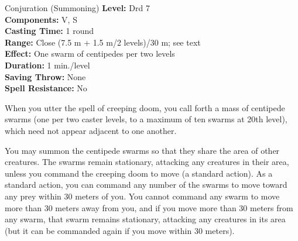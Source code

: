 {Conjuration (Summoning)}
{
	\textbf{Level:}
	Drd 7\\
	\textbf{Components:}
	V, S\\
	\textbf{Casting Time:}
	1 round\\
	\textbf{Range:}
	Close (7.5 m + 1.5 m/2 levels)/30 m; see text\\
	\textbf{Effect:}
	One swarm of centipedes per two levels\\
	\textbf{Duration:}
	1 min./level\\
	\textbf{Saving Throw:}
	None\\
	\textbf{Spell Resistance:}
	No\\
}
{
	When you utter the spell of creeping doom, you call forth a mass of centipede swarms (one per two caster levels, to a maximum of ten swarms at 20th level), which need not appear adjacent to one another.

	You may summon the centipede swarms so that they share the area of other creatures. The swarms remain stationary, attacking any creatures in their area, unless you command the creeping doom to move (a standard action). As a standard action, you can command any number of the swarms to move toward any prey within 30 meters of you. You cannot command any swarm to move more than 30 meters away from you, and if you move more than 30 meters from any swarm, that swarm remains stationary, attacking any creatures in its area (but it can be commanded again if you move within 30 meters).

}
